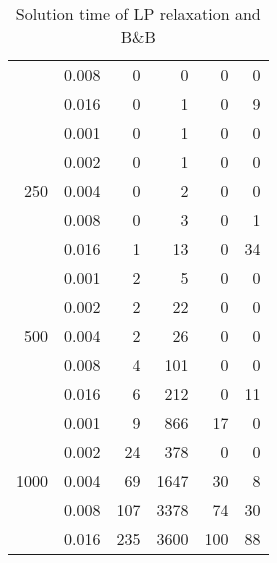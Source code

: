 \begin{table}[]
\begin{minipage}{.45\linewidth}
\begin{tabular}{rrrrrr}
& 0.008 &  0  &  0 &  0  &  0\\
& 0.016 &  0  &  1 &  0  &  9\\ 
\hline
\multirow{5}{*}{250} 
& 0.001 &  0  &  1 & 0   & 0 \\
& 0.002 &  0  &  1 & 0   & 0 \\
& 0.004 &  0  &  2 & 0   & 0 \\
& 0.008 &  0  &  3 & 0   & 1 \\
& 0.016 &  1  & 13 & 0   &34 \\
\hline
\multirow{5}{*}{500} 
& 0.001 &  2  &  5 & 0   & 0 \\
& 0.002 &  2  & 22 & 0   & 0 \\
& 0.004 &  2  & 26 & 0   & 0 \\
& 0.008 &  4  &101 & 0   & 0 \\
& 0.016 &  6  &212 & 0   &11 \\
\hline
\multirow{5}{*}{1000} 
& 0.001 &  9  &866   & 17 & 0  \\
& 0.002 &  24 &378   & 0  & 0  \\
& 0.004 &  69 &1647  & 30 & 8  \\
& 0.008 &  107&3378  & 74 &30  \\
& 0.016 &  235&3600  &100 &88 
\end{tabular}
\end{minipage}
\caption{Solution time of LP relaxation and B\&B}
\label{tab:soltime}
\end{table}
			  
